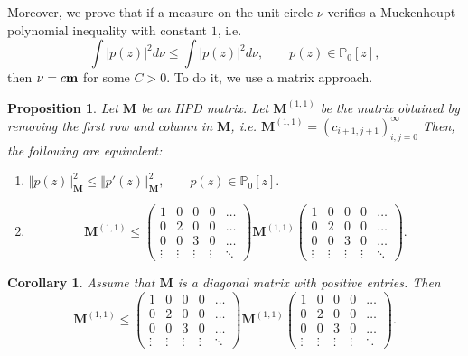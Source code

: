 \documentclass[12pt]{amsart}
\theoremstyle{definition}
\theoremstyle{plain}
\newtheorem{corollary}{Corollary}
\newtheorem{prop}{Proposition}
\theoremstyle{remark}
\begin{document}
\noindent Moreover, we prove  that if a measure on the unit circle $\nu$ verifies a Muckenhoupt polynomial inequality with constant $1$, i.e. 
$$
\int \vert p(z) \vert^{2} d\nu \leq 
\int \vert p(z) \vert^{2} d\nu, \qquad p(z) \in \mathbb{P}_0[z],
$$
\noindent then $\nu=c{\bf m}$ for some $C>0$. To do it, we use a matrix approach.  



\begin{prop} Let $\mathbf{M}$ be an HPD matrix.  Let  $\mathbf{M}^{(1,1)}$ be the matrix obtained by  removing the first row and column in $\mathbf{M}$, i.e. $\mathbf{M}^{(1,1)}=(c_{i+1,j+1})_{i,j=0}^{\infty}$ Then, the following are equivalent: 
 
\begin{enumerate} 
\item 
$
\Vert p(z) \Vert^2_{\mathbf{M}} \leq  \Vert p'(z) \Vert^2_{\mathbf{M}}, \qquad p(z)\in \mathbb{P}_{0}[z].
$
\smallskip
\item 
$$
\mathbf{M}^{(1,1)} \leq \begin{pmatrix}  1 & 0& 0 & 0 & \dots \\  0 & 2& 0 & 0 & \dots \\  0 & 0 & 3 & 0 & \dots \\  \vdots  & \vdots & \vdots & \vdots & \ddots \end{pmatrix} \mathbf{M}^{(1,1)}
\begin{pmatrix}  1 & 0& 0 & 0 & \dots \\  0 & 2& 0 & 0 & \dots \\  0 & 0 & 3 & 0 & \dots \\  \vdots  & \vdots & \vdots & \vdots & \ddots \end{pmatrix}.
$$

\end{enumerate} 
\end{prop} 


\begin{corollary} Assume that $\mathbf{M}$ is a diagonal matrix with positive entries. Then
$$
\mathbf{M}^{(1,1)} \leq \begin{pmatrix}  1 & 0& 0 & 0 & \dots \\  0 & 2& 0 & 0 & \dots \\  0 & 0 & 3 & 0 & \dots \\  \vdots  & \vdots & \vdots & \vdots & \ddots \end{pmatrix} \mathbf{M}^{(1,1)}
\begin{pmatrix}  1 & 0& 0 & 0 & \dots \\  0 & 2& 0 & 0 & \dots \\  0 & 0 & 3 & 0 & \dots \\  \vdots  & \vdots & \vdots & \vdots & \ddots \end{pmatrix}.
$$
\end{corollary} 
\end{document}
